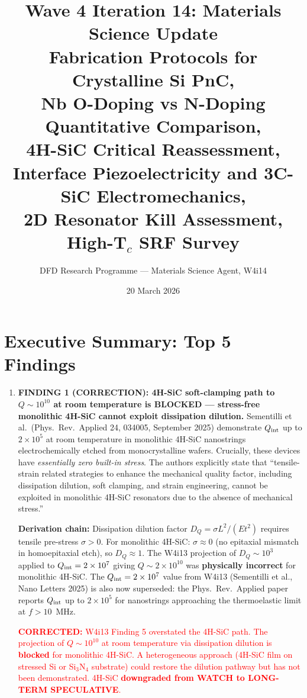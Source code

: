 \documentclass[11pt]{article}
\title{Wave 4 Iteration 14: Materials Science Update\\
\large Fabrication Protocols for Crystalline Si PnC,\\
Nb O-Doping vs N-Doping Quantitative Comparison,\\
4H-SiC Critical Reassessment,\\
Interface Piezoelectricity and 3C-SiC Electromechanics,\\
2D Resonator Kill Assessment, High-T$_c$ SRF Survey}
\author{DFD Research Programme --- Materials Science Agent, W4i14}
\date{20 March 2026}
\theoremstyle{definition}
\theoremstyle{remark}
\newcommand{\ee}[1]{\times 10^{#1}}
\newcommand{\corrected}[1]{\textcolor{red}{\textbf{CORRECTED:} #1}}
\begin{document}
\maketitle
\tableofcontents
\newpage

\section{Executive Summary: Top 5 Findings}
\label{sec:top5}

\begin{tcolorbox}[colback=blue!5!white, colframe=blue!50!black,
  title=\textbf{W4i14 TOP 5 FINDINGS --- Ranked by Programme Impact}]
\begin{enumerate}

\item \textbf{FINDING 1 (CORRECTION): 4H-SiC soft-clamping path to
$Q \sim 10^{10}$ at room temperature is BLOCKED --- stress-free
monolithic 4H-SiC cannot exploit dissipation dilution.}
Sementilli et al.\ (Phys.\ Rev.\ Applied 24, 034005, September 2025)
demonstrate $Q_{\rm int}$ up to $2\ee{5}$ at room temperature in
monolithic 4H-SiC nanostrings electrochemically etched from
monocrystalline wafers. Crucially, these devices have
\textit{essentially zero built-in stress}. The authors explicitly
state that ``tensile-strain related strategies to enhance the
mechanical quality factor, including dissipation dilution, soft
clamping, and strain engineering, cannot be exploited in monolithic
4H-SiC resonators due to the absence of mechanical stress.''

\textbf{Derivation chain:} Dissipation dilution factor
$D_Q = \sigma L^2/(E t^2)$ requires tensile pre-stress $\sigma > 0$.
For monolithic 4H-SiC: $\sigma \approx 0$ (no epitaxial mismatch
in homoepitaxial etch), so $D_Q \approx 1$. The W4i13 projection
of $D_Q \sim 10^3$ applied to $Q_{\rm int} = 2\ee{7}$ giving
$Q \sim 2\ee{10}$ was \textbf{physically incorrect} for monolithic
4H-SiC. The $Q_{\rm int} = 2\ee{7}$ value from W4i13 (Sementilli
et al., Nano Letters 2025) is also now superseded: the Phys.\ Rev.\
Applied paper reports $Q_{\rm int}$ up to $2\ee{5}$ for nanostrings
approaching the thermoelastic limit at $f > 10$~MHz.

\corrected{W4i13 Finding 5 overstated the 4H-SiC path. The projection
of $Q \sim 10^{10}$ at room temperature via dissipation dilution is
\textbf{blocked} for monolithic 4H-SiC. A heterogeneous approach
(4H-SiC film on stressed Si or Si$_3$N$_4$ substrate) could restore
the dilution pathway but has not been demonstrated. 4H-SiC
\textbf{downgraded from WATCH to LONG-TERM SPECULATIVE}.}


\end{enumerate}
\end{tcolorbox}
\end{document}
